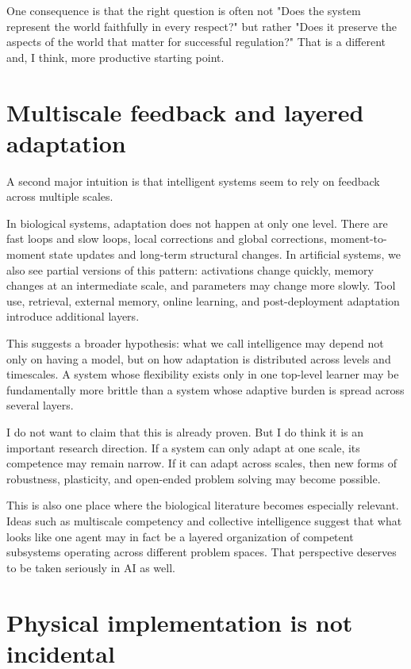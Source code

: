 \documentclass[11pt]{article}
\begin{document}
One consequence is that the right question is often not "Does the system represent the world faithfully in every respect?" but rather "Does it preserve the aspects of the world that matter for successful regulation?" That is a different and, I think, more productive starting point.

\section{Multiscale feedback and layered adaptation}


A second major intuition is that intelligent systems seem to rely on feedback across multiple scales.

In biological systems, adaptation does not happen at only one level. There are fast loops and slow loops, local corrections and global corrections, moment-to-moment state updates and long-term structural changes. In artificial systems, we also see partial versions of this pattern: activations change quickly, memory changes at an intermediate scale, and parameters may change more slowly. Tool use, retrieval, external memory, online learning, and post-deployment adaptation introduce additional layers.

This suggests a broader hypothesis: what we call intelligence may depend not only on having a model, but on how adaptation is distributed across levels and timescales. A system whose flexibility exists only in one top-level learner may be fundamentally more brittle than a system whose adaptive burden is spread across several layers.

I do not want to claim that this is already proven. But I do think it is an important research direction. If a system can only adapt at one scale, its competence may remain narrow. If it can adapt across scales, then new forms of robustness, plasticity, and open-ended problem solving may become possible.

This is also one place where the biological literature becomes especially relevant. Ideas such as multiscale competency and collective intelligence suggest that what looks like one agent may in fact be a layered organization of competent subsystems operating across different problem spaces. That perspective deserves to be taken seriously in AI as well.

\section{Physical implementation is not incidental}
\end{document}
